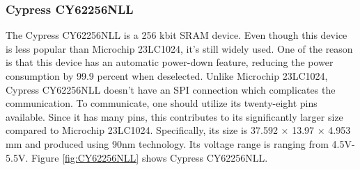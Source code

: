 %
%

\subsubsection{Cypress CY62256NLL}
The Cypress CY62256NLL is a 256 kbit SRAM device. Even though this device is less popular than Microchip 23LC1024, it's still widely used. One of the reason is that this device has an automatic power-down feature, reducing the power consumption by 99.9 percent when deselected. Unlike Microchip 23LC1024, Cypress CY62256NLL doesn't have an SPI connection which complicates the communication. To communicate, one should utilize its twenty-eight pins available. Since it has many pins, this contributes to its significantly larger size compared to Microchip 23LC1024. Specifically, its size is 37.592 × 13.97 × 4.953 mm and produced using 90nm technology. Its voltage range is ranging from 4.5V-5.5V. Figure \ref{fig:CY62256NLL} shows Cypress CY62256NLL.

